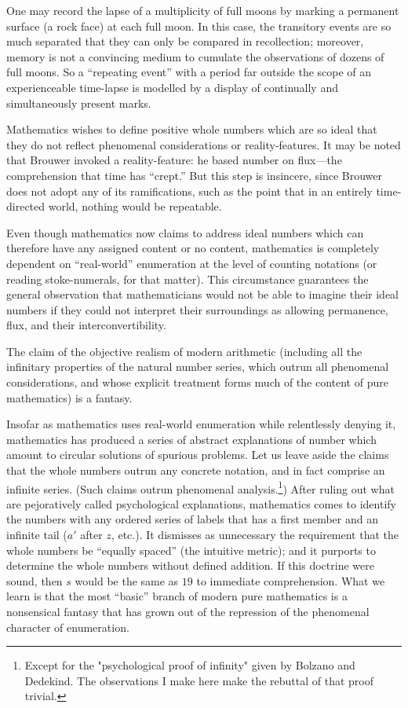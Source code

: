 One may record the lapse of a multiplicity of full moons by marking a permanent surface (a rock face) at each full moon. In this case, the transitory events are so much separated that they can only be compared in recollection; moreover, memory is not a convincing medium to cumulate the observations of dozens of full moons. So a \enquote{repeating event} with a period far outside the scope of an experienceable time-lapse is modelled by a display of continually and simultaneously present marks.

\jarule

Mathematics wishes to define positive whole numbers which are so ideal that they do not reflect phenomenal considerations or reality-features. It may be noted that Brouwer invoked a reality-feature: he based number on flux---the comprehension that time has \enquote{crept.} But this step is insincere, since Brouwer does not adopt any of its ramifications, such as the point that in an entirely time-directed world, nothing would be repeatable.

Even though mathematics now claims to address ideal numbers which can therefore have any assigned content or no content, mathematics is completely dependent on \enquote{real-world} enumeration at the level of counting notations (or reading stoke-numerals, for that matter). This circumstance guarantees the general observation that mathematicians would not be able to imagine their ideal numbers if they could not interpret their surroundings as allowing permanence, flux, and their interconvertibility.

The claim of the objective realism of modern arithmetic (including all the infinitary properties of the natural number series, which outrun all phenomenal considerations, and whose explicit treatment forms much of the content of pure mathematics) is a fantasy.

Insofar as mathematics uses real-world enumeration while relentlessly denying it, mathematics has produced a series of abstract explanations of number which amount to circular solutions of spurious problems. Let us leave aside the claims that the whole numbers outrun any concrete notation, and in fact comprise an infinite series. (Such claims outrun phenomenal analysis.\footnote{Except for the "psychological proof of infinity" given by Bolzano and Dedekind. The observations I make here make the rebuttal of that proof trivial.}) After ruling out what are pejoratively called psychological explanations, mathematics comes to identify the numbers with any ordered series of labels that has a first member and an infinite tail ($a'$ after $z$, etc.). It dismisses as unnecessary the requirement that the whole numbers be \enquote{equally spaced} (the intuitive metric); and it purports to determine the whole numbers without defined addition. If this doctrine were sound, then $s$ would be the same as $19$ to immediate comprehension. What we learn is that the most \enquote{basic} branch of modern pure mathematics is a nonsensical fantasy that has grown out of the repression of the phenomenal character of enumeration.

